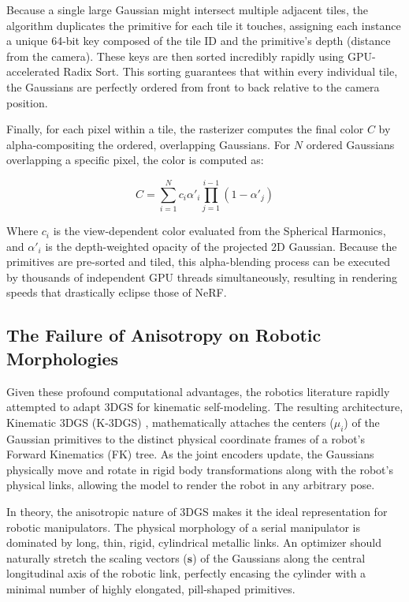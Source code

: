 \documentclass[12pt,a4paper,oneside]{report}
\begin{document}
Because a single large Gaussian might intersect multiple adjacent tiles, the algorithm duplicates the primitive for each tile it touches, assigning each instance a unique 64-bit key composed of the tile ID and the primitive's depth (distance from the camera). These keys are then sorted incredibly rapidly using GPU-accelerated Radix Sort. This sorting guarantees that within every individual tile, the Gaussians are perfectly ordered from front to back relative to the camera position.

Finally, for each pixel within a tile, the rasterizer computes the final color $C$ by alpha-compositing the ordered, overlapping Gaussians. For $N$ ordered Gaussians overlapping a specific pixel, the color is computed as:

\begin{equation}
C = \sum_{i=1}^{N} c_i \alpha'_i \prod_{j=1}^{i-1} (1 - \alpha'_j)
\end{equation}

Where $c_i$ is the view-dependent color evaluated from the Spherical Harmonics, and $\alpha'_i$ is the depth-weighted opacity of the projected 2D Gaussian. Because the primitives are pre-sorted and tiled, this alpha-blending process can be executed by thousands of independent GPU threads simultaneously, resulting in rendering speeds that drastically eclipse those of NeRF.

\subsection{The Failure of Anisotropy on Robotic Morphologies}

Given these profound computational advantages, the robotics literature rapidly attempted to adapt 3DGS for kinematic self-modeling. The resulting architecture, Kinematic 3DGS (K-3DGS) \cite{hu2025learning}, mathematically attaches the centers ($\mu_i$) of the Gaussian primitives to the distinct physical coordinate frames of a robot's Forward Kinematics (FK) tree. As the joint encoders update, the Gaussians physically move and rotate in rigid body transformations along with the robot's physical links, allowing the model to render the robot in any arbitrary pose. 

In theory, the anisotropic nature of 3DGS makes it the ideal representation for robotic manipulators. The physical morphology of a serial manipulator is dominated by long, thin, rigid, cylindrical metallic links. An optimizer should naturally stretch the scaling vectors ($\mathbf{s}$) of the Gaussians along the central longitudinal axis of the robotic link, perfectly encasing the cylinder with a minimal number of highly elongated, pill-shaped primitives.
\end{document}
